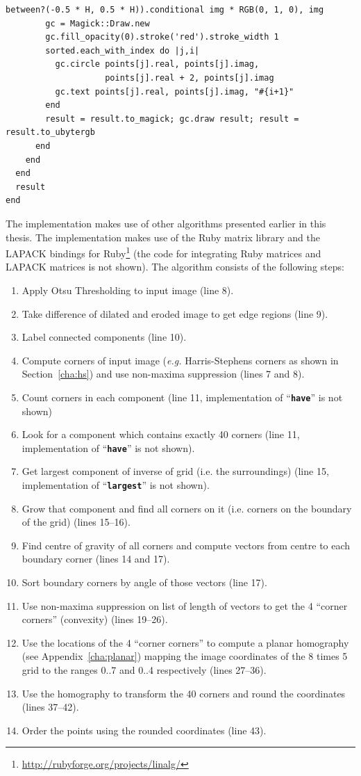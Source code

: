 \documentclass[12pt,a4paper,oneside,openright]{book}
\newcommand{\eg}{\emph{e.g.} }
\newcommand{\sct}[1]{Section~\ref{cha:#1}}
\newcommand{\anx}[1]{Appendix~\ref{cha:#1}}
\newcommand{\code}[1]{``\texttt{\textbf{\textcolor{codegray}{\small{#1}}}}''}
\begin{document}
\begin{CJK}{UTF8}{}
\begin{lstlisting}[float,caption={Custom algorithm for labelling the corners of a calibration grid},escapechar=\$,label=lst:grid]
          between?(-0.5 * H, 0.5 * H)).conditional img * RGB(0, 1, 0), img
        gc = Magick::Draw.new
        gc.fill_opacity(0).stroke('red').stroke_width 1
        sorted.each_with_index do |j,i|
          gc.circle points[j].real, points[j].imag,
                    points[j].real + 2, points[j].imag
          gc.text points[j].real, points[j].imag, "#{i+1}"
        end
        result = result.to_magick; gc.draw result; result = result.to_ubytergb
      end
    end
  end
  result
end
\end{lstlisting}
The implementation makes use of other algorithms presented earlier in this thesis. The implementation makes use of the Ruby matrix library and the LAPACK bindings for Ruby\footnote{\url{http://rubyforge.org/projects/linalg/}} (the code for integrating Ruby matrices and LAPACK matrices is not shown). The algorithm consists of the following steps:
\begin{enumerate}
\item Apply Otsu Thresholding to input image (line 8).
\item Take difference of dilated and eroded image to get edge regions (line 9).
\item Label connected components (line 10).
\item Compute corners of input image (\eg Harris-Stephens corners as shown in \sct{hs}) and use non-maxima suppression (lines 7 and 8).
\item Count corners in each component (line 11, implementation of \code{have} is not shown)
\item Look for a component which contains exactly 40 corners (line 11, implementation of \code{have} is not shown).
\item Get largest component of inverse of grid (i.e. the surroundings) (line 15, implementation of \code{largest} is not shown).
\item Grow that component and find all corners on it (i.e. corners on the boundary of the grid) (lines 15--16).
\item Find centre of gravity of all corners and compute vectors from centre to each boundary corner (lines 14 and 17).
\item Sort boundary corners by angle of those vectors (line 17).
\item Use non-maxima suppression on list of length of vectors to get the 4 “corner corners” (convexity) (lines 19--26).
\item Use the locations of the 4 “corner corners” to compute a planar homography (see \anx{planar}) mapping the image coordinates of the 8 times 5 grid to the ranges 0..7 and 0..4 respectively (lines 27--36).
\item Use the homography to transform the 40 corners and round the coordinates (lines 37--42).
\item Order the points using the rounded coordinates (line 43).
\end{enumerate}


\end{CJK}
\end{document}
